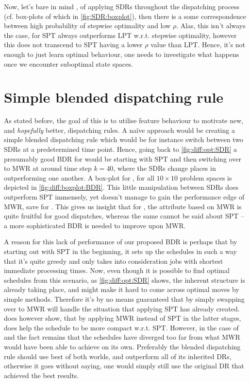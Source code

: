 Now, let's bare in mind \namerho, of applying SDRs throughout the dispatching process (cf. box-plots of which in \cref{fig:SDR:boxplot}), then there is a some correspondence between high probability of stepwise optimality and low $\rho$. Alas, this isn't always the case, for  SPT always outperforms LPT w.r.t. stepwise optimality, however this does not transcend to SPT having a lower $\rho$ value than LPT. Hence, it's not enough to just learn optimal behaviour, one needs to investigate what happens once we encounter suboptimal state spaces.

\section{Simple blended dispatching rule}\label{sec:diff:opt:bdr}
As stated before, the goal of this  is to utilise feature behaviour to motivate new, and \emph{hopefully} better, dispatching rules. 
A na\"ive approach would be creating a simple blended dispatching rule which would be for instance switch between two SDRs at a predetermined time point. Hence, going back to \cref{fig:diff:opt:SDR} a presumably good BDR for   would be starting with SPT and then switching over to MWR at around time step $k=40$, where the SDRs change places in outperforming one another. A box-plot for \namerho, for all $10\times10$ problem spaces is depicted in \cref{fig:diff:boxplot:BDR}. This little manipulation between SDRs does outperform SPT immensely, yet doesn't manage to gain the performance edge of MWR, save for . This gives us insight that for \jsp, the attribute based on MWR is quite fruitful for good dispatches, whereas the same cannot be said about SPT -- a more sophisticated BDR is needed to improve upon MWR. 

A reason for this lack of performance of our proposed BDR is perhaps that by starting out with SPT in the beginning, it sets up the schedules in such a way that it's quite greedy and only takes into consideration jobs with shortest immediate processing times. Now, even though it is possible to find optimal schedules from this scenario, as \cref{fig:diff:opt:SDR} shows, the inherent structure is already taking place, and might make it hard to come across optimal moves by simple methods. Therefore it's by no means guaranteed that by simply swapping over to MWR will handle the situation that applying SPT has already created.  does however show, that by applying MWR instead of SPT in the latter stages, does help the schedule to be more compact w.r.t. SPT. However, in the case of  and  the fact remains that the schedules have diverged too far from what MWR would have been able to achieve on its own. Preferably the blended dispatching rule should use  best of both worlds, and outperform all of its inherited DRs, otherwise it goes without saying, one would simply still use the original DR that achieved the best results.

